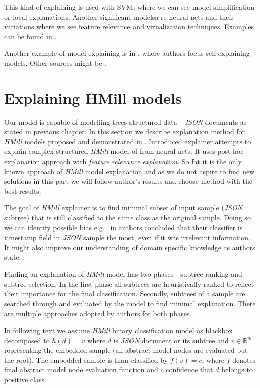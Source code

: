 This kind of explaining is used with SVM, where we can see model simplification or local explanations. Another significant modelsa re neural nets and their variations where we see feature relevance and vizualization techniques. Examples can be found in \cite{Arrieta2019}.

Another example of model explaining is in \cite{Alvarez-Melis2018}, where authors focus self-explaining models. Other sources might be \cite{Strumbelj2013,Robnik-Sikonja2008,Montavon2018}.


\section{Explaining HMill models}
Our model is capable of modelling trees structured data - \emph{JSON} documents as stated in previous chapter. In this section we describe explanation method for \emph{HMill} models proposed and demonstrated in \cite{Pevny2020}. Introduced explainer attempts to explain complex structured \emph{HMill} model of from neural nets. It uses post-hoc explanation approach with \emph{feature relevance explanation}. So fat it is the only known approach of \emph{HMill} model explanation and as we do not aspire to find new solutions in this part we will follow author's results and choose method with the best results.

The goal of \emph{HMill} explainer is to find minimal subset of input sample (\emph{JSON} subtree) that is still classified to the same class as the original sample. Doing so we can identify possible bias e.g. \ in \cite{Mandlik2020} authors concluded that their classifier is timestamp field in \emph{JSON} sample the most, even if it was irrelevant information. It might also improve our understanding of domain specific knowledge as authors state.

Finding an explanation of \emph{HMill} model has two phases - subtree ranking and subtree selection. In the first phase all subtrees are heuristically ranked to reflect their importance for the final classification. Secondly, subtrees of a sample are searched through and evaluated by the model to find minimal explanation. There are multiple approaches adopted by authors for both phases. 

In following text we assume \emph{HMill} binary classification model as blackbox decomposed to $h(d)=v$ where $d$ is \emph{JSON} document or its subtree and $v\in\mathbb{R}^{m}$ representing the embedded sample (all abstract model nodes are evaluated but the root). The embedded sample is than classified by $f(v)=c$, where $f$ denotes final abstract model node evaluation function and $c$ confidence that $d$ belongs to positive class.


